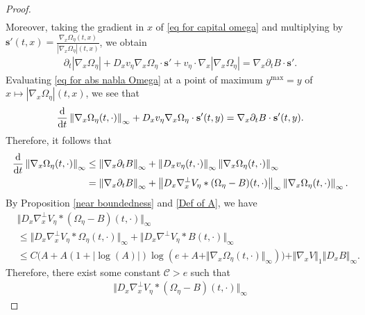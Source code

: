 \documentclass[11pt,reqno]{amsart}
\numberwithin{equation}{section}
\def\dd{{\rm d}}
\begin{document}
\begin{proof}
\begin{align}
\end{align}
Moreover, taking the gradient in $x$ of \eqref{eq for capital omega} and multiplying by $\mathbf{s}'(t,x)=\frac{\nabla_{x}\Omega_{\eta}(t,x)}{\left\vert \nabla_{x}\Omega_{\eta}\right\vert(t,x)}$, we obtain 
\begin{align}
\partial_{t}\left\vert \nabla_{x}\Omega_{\eta}\right\vert+D_{x}v_{\eta}\nabla_{x}\Omega_{\eta}\cdot \mathbf{s}'+v_{\eta}\cdot \nabla_{x}\left\vert \nabla_{x}\Omega_{\eta}\right\vert=\nabla_{x}\partial_{t}B\cdot \mathbf{s}'.  \label{eq for abs nabla Omega}
\end{align}
Evaluating \eqref{eq for abs nabla Omega} at a point of maximum $y^{\max}=y$ of $x\mapsto \left\vert \nabla_{x}\Omega_{\eta}\right\vert(t,x)$, we see that 
\begin{align*}
\frac{\dd}{\dd t}\left\Vert \nabla_{x}\Omega_{\eta}(t,\cdot)\right\Vert_{\infty}+D_{x}v_{\eta}\nabla_{x}\Omega_{\eta}\cdot\mathbf{s}'(t,y)=\nabla_{x}\partial_{t}B\cdot \mathbf{s}'(t,y).      
\end{align*}
Therefore, it follows that  
\begin{align}
\frac{\dd}{\dd t}\left\Vert \nabla_{x}\Omega_{\eta}(t,\cdot)\right\Vert_{\infty}&\leq \left\Vert \nabla_{x}\partial_{t}B\right\Vert_{\infty}+\left\Vert D_{x}v_{\eta}(t,\cdot)\right\Vert_{\infty} \left\Vert \nabla_{x}\Omega_{\eta}(t,\cdot)\right\Vert_{\infty} \notag\\
&=\left\Vert \nabla_{x}\partial_{t}B\right\Vert_{\infty}+\big\Vert D_{x}\nabla_{x}^{\perp}V_{\eta}\ast(\Omega_{\eta}-B)(t,\cdot) \big\Vert_{\infty}\left\Vert \nabla_{x}\Omega_{\eta}(t,\cdot)\right\Vert_{\infty}. \label{est time der of nablaomega}         \end{align}
By Proposition \ref{near boundedness} and \eqref{Def of A}, we have 
\begin{align*}
&\big\Vert D_{x}\nabla_{x}^{\perp}V_{\eta}\ast (\Omega_{\eta}-B)(t,\cdot)\big\Vert_{\infty}\\
&\leq \big\Vert D_{x}\nabla_{x}^{\perp}V_{\eta}\ast \Omega_{\eta}(t,\cdot)\big\Vert_{\infty}
+\big\Vert D_{x}\nabla^{\perp}V_{\eta}\ast B(t,\cdot)\big\Vert_{\infty} \\
&\leq C\big(A+A(1+|\log(A)|)\log(e+A+\Vert \nabla_{x}\Omega_{\eta}(t,\cdot)\Vert_{\infty}  )\big)
+\Vert \nabla_{x}V\Vert_{1} \Vert D_{x}B\Vert_{\infty}. 
\end{align*}
Therefore, there exist some constant $\mathcal{C}>e$ such that 
\begin{align}
\big\Vert D_{x}\nabla_{x}^{\perp}V_{\eta}\ast (\Omega_{\eta}-B)(t,\cdot)\big\Vert_{\infty}

\end{align}
\end{proof}
\end{document}

